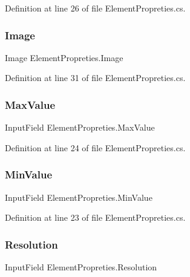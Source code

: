 Definition at line 26 of file Element\+Propreties.\+cs.

\mbox{\label{class_element_propreties_a69343a549bc411aa7178bd8255418cc6}} 
\subsubsection{Image}
{\footnotesize\ttfamily Image Element\+Propreties.\+Image}



Definition at line 31 of file Element\+Propreties.\+cs.

\mbox{\label{class_element_propreties_ac788361875551a7f94b64d5b4f0e7850}} 
\subsubsection{Max\+Value}
{\footnotesize\ttfamily Input\+Field Element\+Propreties.\+Max\+Value\hspace{0.3cm}{\ttfamily [protected]}}



Definition at line 24 of file Element\+Propreties.\+cs.

\mbox{\label{class_element_propreties_af48b8174dfd055c7173668ed1d0d151f}} 
\subsubsection{Min\+Value}
{\footnotesize\ttfamily Input\+Field Element\+Propreties.\+Min\+Value\hspace{0.3cm}{\ttfamily [protected]}}



Definition at line 23 of file Element\+Propreties.\+cs.

\mbox{\label{class_element_propreties_a2ab17b0cafc4345d76c7bfa9dc74637e}} 
\subsubsection{Resolution}
{\footnotesize\ttfamily Input\+Field Element\+Propreties.\+Resolution}



